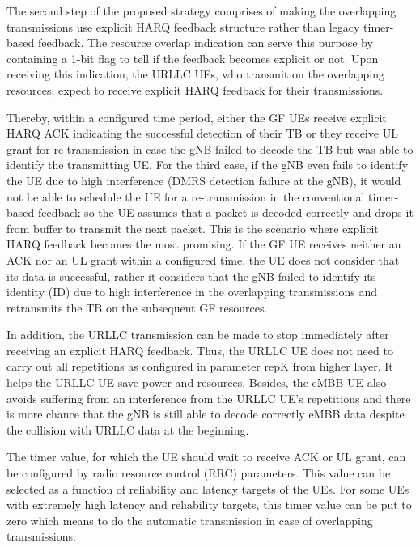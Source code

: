 \documentclass[conference]{IEEEtran}
\begin{document}
The second step of the proposed strategy comprises of making the overlapping transmissions use explicit HARQ feedback structure rather than legacy timer-based feedback. The resource overlap indication can serve this purpose by containing a 1-bit flag to tell if the feedback becomes explicit or not. Upon receiving this indication, the URLLC UEs, who transmit on the overlapping resources, expect to receive explicit HARQ feedback for their transmissions. 

Thereby, within a configured time period, either the GF UEs receive explicit HARQ ACK indicating the successful detection of their TB or they receive UL grant for re-transmission in case the gNB failed to decode the TB but was able to identify the transmitting UE.  For the third case, if the gNB even fails to identify the UE due to high interference (DMRS detection failure at the gNB), it would not be able to schedule the UE for a re-transmission in the conventional timer-based feedback so the UE assumes that a packet is decoded correctly and drops it from buffer to transmit the next packet. This is the scenario where explicit HARQ feedback becomes the most promising. If the GF UE receives neither an ACK nor an UL grant within a configured time, the UE does not consider that its data is successful, rather it considers that the gNB failed to identify its identity (ID) due to high interference in the overlapping transmissions and retransmits the TB on the subsequent GF resources.

In addition, the URLLC transmission can be made to stop immediately after receiving an explicit HARQ feedback. Thus, the URLLC UE does not need to carry out all repetitions as configured in parameter repK from higher layer. It helps the URLLC UE save power and resources. Besides, the eMBB UE also avoids suffering from an interference from the URLLC UE’s repetitions and there is more chance that the gNB is still able to decode correctly eMBB data despite the collision with URLLC data at the beginning. 

The timer value, for which the UE should wait to receive ACK or UL grant, can be configured by radio resource control (RRC) parameters. This value can be selected as a function of reliability and latency targets of the UEs. For some UEs with extremely high latency and reliability targets, this timer value can be put to zero which means to do the automatic transmission in case of overlapping transmissions.
\end{document}
